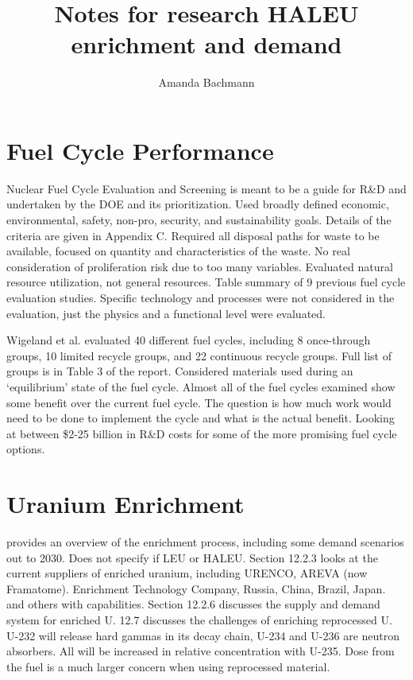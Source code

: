 \documentclass{article}
\begin{document}
\title{Notes for research HALEU enrichment and demand}
\author{Amanda Bachmann}
\maketitle

\section{Fuel Cycle Performance}
Nuclear Fuel Cycle Evaluation and Screening \cite{wigeland_nuclear_2014}
is meant to be a guide for R\&D and undertaken by the DOE and its 
prioritization. Used broadly defined economic, environmental, safety, 
non-pro, security, and sustainability goals. Details of the criteria 
are given in Appendix C. Required all disposal paths for waste to be 
available, focused on quantity and characteristics of the waste. No 
real consideration of proliferation risk due to too many variables. 
Evaluated natural resource utilization, not general resources. Table 
summary of 9 previous fuel cycle evaluation studies. Specific 
technology and processes were not considered in the evaluation, 
just the physics and a functional level were evaluated. 

Wigeland et al. \cite{wigeland_nuclear_2014} evaluated 40 different 
fuel cycles, including 8 once-through groups, 10 limited recycle 
groups, and 22 continuous recycle groups. Full list of groups is 
in Table 3 of the report. Considered materials used during an 
`equilibrium' state of the fuel cycle. Almost all of the fuel cycles 
examined show some benefit over the current fuel cycle. The question 
is how much work would need to be done to implement the cycle and 
what is the actual benefit. Looking at between \$2-25 billion in 
R\&D costs for some of the more promising fuel cycle options. 

\section{Uranium Enrichment}
\cite{harding_12_2016} provides an overview of the enrichment process, 
including some demand scenarios out to 2030. Does not specify if 
LEU or HALEU. Section 12.2.3 looks at the current suppliers of enriched 
uranium, including URENCO, AREVA (now Framatome). Enrichment Technology 
Company, Russia, China, Brazil, Japan. and others with capabilities. 
Section 12.2.6 discusses the supply and demand system for enriched U. 
12.7 discusses the challenges of enriching reprocessed U. U-232 will 
release hard gammas in its decay chain, U-234 and U-236 are neutron 
absorbers. All will be increased in relative concentration with U-235. 
Dose from the fuel is a much larger concern when using reprocessed 
material. 
\end{document}
